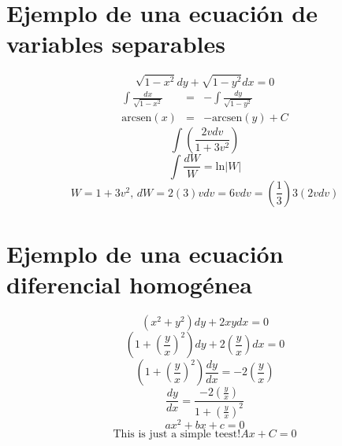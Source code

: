 \documentclass[12pt]{article}
\begin{document}
\section{
Ejemplo de una ecuaci\'{o}n de variables separables
}
\begin{equation}
\sqrt{1-x^{2}}dy+\sqrt{1-y^{2}}dx=0
\end{equation}
\begin{eqnarray}
\int\frac{dx}{\sqrt{1-x^{2}}}&=&-\int\frac{dy}{\sqrt{1-y^{2}}}\\
\mbox{arcsen}(x)&=&-\mbox{arcsen}(y)+C
\end{eqnarray}
\begin{equation}
\int\left(\frac{2vdv}{1+3v^{2}}\right)
\end{equation}
\begin{equation}
\int\frac{dW}{W}=\mbox{ln}|W|
\end{equation}
\begin{equation}
W=1+3v^{2}\mbox{,\ \ }dW=2(3)vdv=6vdv=(\frac{1}{3})3(2vdv)
\end{equation}
\section{Ejemplo de una ecuaci\'{o}n diferencial homog\'{e}nea}
\begin{equation}
(x^{2}+y^{2})dy+2xydx=0
\end{equation}
\begin{equation}
\left(1+\left(\frac{y}{x}\right)^{2}\right)dy+2\left(\frac{y}{x}\right)dx=0
\end{equation} 
\begin{equation}
\left(1+\left(\frac{y}{x}\right)^{2}\right)\frac{dy}{dx}=-2\left(\frac{y}{x}\right)
\end{equation}
\begin{equation}
\frac{dy}{dx}=\frac{-2\left(\frac{y}{x}\right)}{1+\left(\frac{y}{x}\right)^{2}}
\end{equation}
\begin{equation}
 ax^{2}+bx+c=0
\end{equation}
\begin{equation}
 \mbox{This is just a simple teest!}Ax+C=0
\end{equation}
\end{document}
